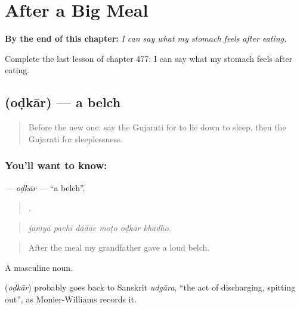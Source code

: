 
\chapter{After a Big Meal}
\label{ch:gu-after-a-big-meal}

\begin{chapteropening}
\textbf{By the end of this chapter:} \emph{I can say what my stomach feels after eating.}

Complete the last lesson of chapter 477: I can say what my stomach feels after eating.
\end{chapteropening}

\section[\texorpdfstring{\gu{ઓડકાર} (oḍkār)}{ઓડકાર (oḍkār)}]{ (oḍkār) — a belch}

\label{lesson:GU-C477-odkar}



\begin{quote}
Before the new one: say the Gujarati for to lie down to sleep, then the Gujarati for sleeplessness.
\end{quote}

\subsection*{You'll want to know: }
\textbf{} — \emph{oḍkār} — \textquotedblleft{}a belch\textquotedblright{}.

\begin{quote}
     .
\end{quote}

\begin{quote}
\emph{jamyā pachī dādāe moṭo oḍkār khādho.}
\end{quote}

\begin{quote}
After the meal my grandfather gave a loud belch.
\end{quote}

A masculine noun.

\begin{cousinweb}
\textbf{} (\emph{oḍkār}) probably goes back to Sanskrit \emph{udgāra}, \textquotedblleft{}the act of discharging, spitting out\textquotedblright{}, as Monier-Williams records it.
\end{cousinweb}

